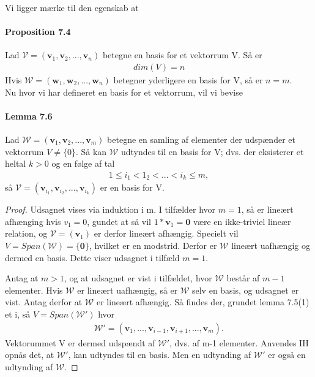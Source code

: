 \documentclass[paper=a4, fontsize=11pt]{scrartcl} %
\begin{document}
	Vi ligger mærke til den egenskab at
	
	\paragraph{Proposition 7.4} Lad $\mathcal{V}=(\mathbf{v}_1,\mathbf{v}_2,...,\mathbf{v}_n)$ betegne en basis for et vektorrum V. Så er 
	\begin{align*}
		dim(V)=n
	\end{align*}
	Hvis $\mathcal{W}=(\mathbf{w}_1,\mathbf{w}_2,...,\mathbf{w}_n)$ betegner yderligere en basis for V, så er $n=m$.\\
	
	Nu hvor vi har defineret en basis for et vektorrum, vil vi bevise 
	
	\paragraph{Lemma 7.6} Lad $\mathcal{W}=(\mathbf{v}_1,\mathbf{v}_2,...,\mathbf{v}_m)$ betegne en samling af elementer der udspænder et vektorrum $V\neq \{0\}$. Så kan $\mathcal{W}$ udtyndes til en basis for V; dvs. der eksisterer et heltal $k>0$ og en følge af tal
	\begin{align*}
		1\leq i_1 < 1_2 < ... < i_k \leq m,
	\end{align*}
	så $\mathcal{V}=(\mathbf{v}_{i_1},\mathbf{v}_{i_2},...,\mathbf{v}_{i_k})$ er en basis for V.
	\begin{proof}
		Udsagnet vises via induktion i m. I tilfælder hvor $m=1$, så er lineært afhænging hvis $v_1=0$, gundet at så vil $1*\mathbf{v}_1=\mathbf{0}$ være en ikke-triviel lineær relation, og $\mathcal{V}=(\mathbf{v}_1)$ er derfor lineært afhængig. Specielt vil $V=Span(\mathcal{W})=\{\mathbf{0}\}$, hvilket er en modstrid. Derfor er $\mathcal{W}$ lineært uafhængig og dermed en basis. Dette viser udsagnet i tilfæld $m=1$.	
		
		Antag at $m>1$, og at udsagnet er vist i tilfældet, hvor $\mathcal{W}$ består af $m-1$ elementer. Hvis $\mathcal{W}$ er lineært uafhængig, så er $\mathcal{W}$ selv en basis, og udsagnet er vist. Antag derfor at $\mathcal{W}$ er lineært afhængig. Så findes der, grundet lemma 7.5(1) et i, så $V=Span(\mathcal{W}')$ hvor
		\begin{align*}
			\mathcal{W}'=(\mathbf{v}_1,...,\mathbf{v}_{i-1},\mathbf{v}_{i+1},...,\mathbf{v}_m).
		\end{align*}
		Vektorummet V er dermed udspændt af $\mathcal{W}'$, dvs. af m-1 elementer. Anvendes IH opnås det, at $\mathcal{W}'$, kan udtyndes til en basis. Men en udtynding af $\mathcal{W}'$ er også en udtynding af $\mathcal{W}$.
	\end{proof}
	
\end{document}
